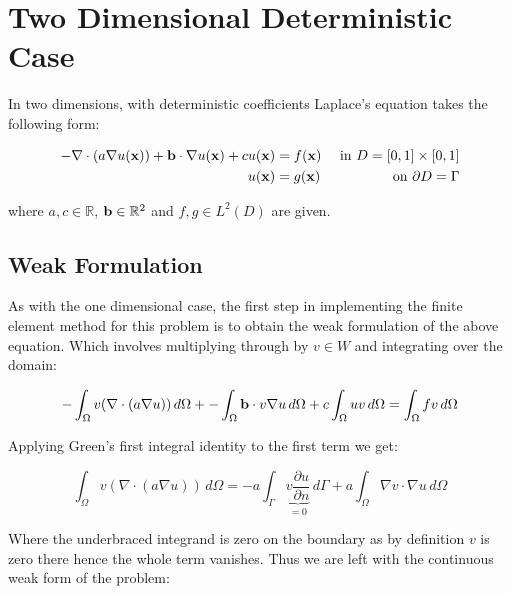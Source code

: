 \chapter{Two Dimensional Deterministic Case}\label{chap:two-d-deterministic}

In two dimensions, with deterministic coefficients Laplace's equation takes the
following form:

\begin{equation}\label{eq:two-d-deterministic}
\begin{aligned}
    -\nabla\cdot(a\nabla u(\mathbf{x})) + \mathbf{b} \cdot \nabla u(\mathbf{x}) + c u(\mathbf{x}) &= f(\mathbf{x})
                               &\text{ in } D = [0,1] \times [0,1] \\
    u(\mathbf{x}) &= g(\mathbf{x}) &\text{ on } \partial D = \Gamma
\end{aligned}
\end{equation}

where $a, c \in \mathbb{R}$, $\mathbf{b} \in \mathbb{R}^2$ and $f, g \in L^2(D)$ are
given.

\section{Weak Formulation}


As with the one dimensional case, the first step in implementing the finite
element method for this problem is to obtain the weak formulation of the above
equation. Which involves multiplying through by $v \in W$ and integrating over
the domain:

\begin{equation}
    -\int_{\Omega}{v(\nabla\cdot(a\nabla{u}))}\,d\Omega +
    -\int_{\Omega}\mathbf{b}\cdot v\nabla{u}\,d\Omega +
    c\int_{\Omega}uv\,d\Omega = \int_{\Omega}fv\,d\Omega
\end{equation}

Applying Green's first integral identity to the first term we get:

\begin{equation}
    \int_{\Omega}v(\nabla\cdot(a\nabla u))\, d\Omega =
    -a\int_{\Gamma}\underbrace{v\frac{\partial{u}}{\partial{n}}}_{ =0} \,d\Gamma
    + a\int_{\Omega}\nabla{v}\cdot\nabla{u}\,d\Omega
\end{equation}

Where the underbraced integrand is zero on the boundary as by definition $v$ is
zero there hence the whole term vanishes. Thus we are left with the continuous
weak form of the problem:

